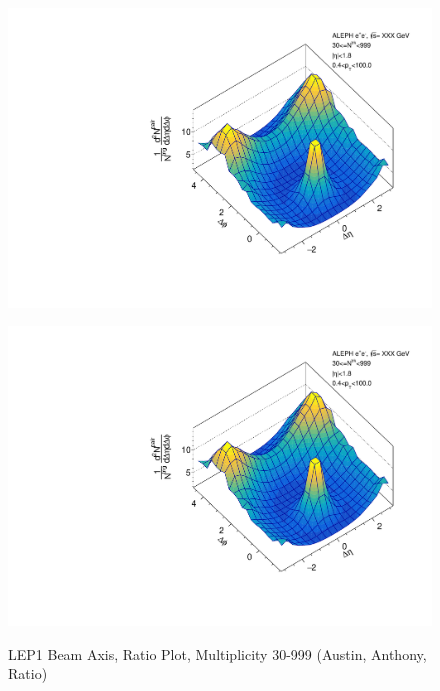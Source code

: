 \begin{figure}[htbp]
  \caption{LEP1 Beam Axis, Ratio Plot, Multiplicity 30-999 (Austin, Anthony, Ratio)}
  \begin{minipage}[b]{0.32\linewidth}
    \centering
    \includegraphics[width=\linewidth]{images/TwoParticleCorrelation/LEP1_BEAM/LEP1_BEAM_ratio1_30_999.pdf}
    \label{fig:LEP1 Beam Axis, Ratio Plot, Multiplicity 30-999, Austin}
  \end{minipage}
  \hspace{0.0cm}
  \begin{minipage}[b]{0.32\linewidth}
    \centering
    \includegraphics[width=\linewidth]{images/TwoParticleCorrelation/LEP1_BEAM/LEP1_BEAM_ratio2_30_999.pdf}
    \label{fig:LEP1 Beam Axis, Ratio Plot, Multiplicity 30-999, Anthony}

\end{minipage}
\end{figure}
